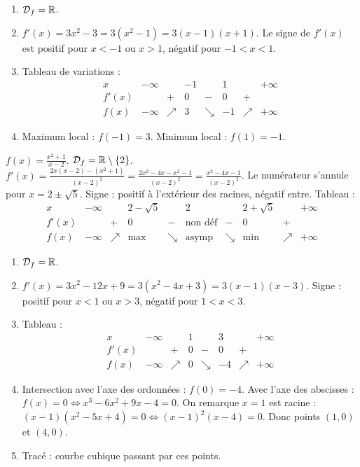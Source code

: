 \begin{enumerate}[label=\alph*)]
\item \(\mathcal{D}_f=\mathbb{R}\).
\item \(f'(x)=3x^2-3=3(x^2-1)=3(x-1)(x+1)\). Le signe de \(f'(x)\) est positif pour \(x<-1\) ou \(x>1\), négatif pour \(-1<x<1\).
\item Tableau de variations :
\[
\begin{array}{c|ccccccccccc}
x & -\infty & & -1 & & 1 & & +\infty \\
\hline
f'(x) & & + & 0 & - & 0 & + & \\
\hline
f(x) & -\infty & \nearrow & 3 & \searrow & -1 & \nearrow & +\infty
\end{array}
\]
\item Maximum local : \(f(-1)=3\). Minimum local : \(f(1)=-1\).
\end{enumerate}

\(f(x)=\frac{x^2+1}{x-2}\). \(\mathcal{D}_f=\mathbb{R}\setminus\{2\}\). \(f'(x)=\frac{2x(x-2)-(x^2+1)}{(x-2)^2}=\frac{2x^2-4x-x^2-1}{(x-2)^2}=\frac{x^2-4x-1}{(x-2)^2}\). Le numérateur s'annule pour \(x=2\pm\sqrt{5}\). Signe : positif à l'extérieur des racines, négatif entre. Tableau :
\[
\begin{array}{c|ccccccccccc}
x & -\infty & & 2-\sqrt{5} & & 2 & & 2+\sqrt{5} & & +\infty \\
\hline
f'(x) & & + & 0 & - & \text{non déf} & - & 0 & + & \\
\hline
f(x) & -\infty & \nearrow & \text{max} & \searrow & \text{asymp} & \searrow & \text{min} & \nearrow & +\infty
\end{array}
\]

\begin{enumerate}[label=\alph*)]
\item \(\mathcal{D}_f=\mathbb{R}\).
\item \(f'(x)=3x^2-12x+9=3(x^2-4x+3)=3(x-1)(x-3)\). Signe : positif pour \(x<1\) ou \(x>3\), négatif pour \(1<x<3\).
\item Tableau :
\[
\begin{array}{c|ccccccccccc}
x & -\infty & & 1 & & 3 & & +\infty \\
\hline
f'(x) & & + & 0 & - & 0 & + & \\
\hline
f(x) & -\infty & \nearrow & 0 & \searrow & -4 & \nearrow & +\infty
\end{array}
\]
\item Intersection avec l'axe des ordonnées : \(f(0)=-4\). Avec l'axe des abscisses : \(f(x)=0\iff x^3-6x^2+9x-4=0\). On remarque \(x=1\) est racine : \((x-1)(x^2-5x+4)=0\iff (x-1)^2(x-4)=0\). Donc points \((1,0)\) et \((4,0)\).
\item Tracé : courbe cubique passant par ces points.
\end{enumerate}

